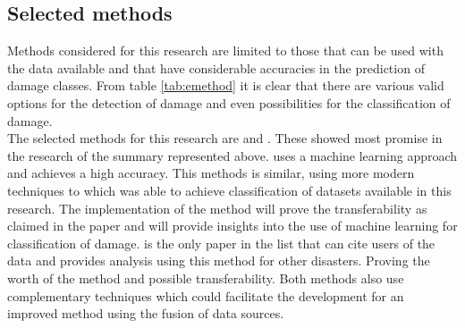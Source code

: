 \subsection{Selected methods} \label{sec:smethod}
Methods considered for this research are limited to those that can be used with the data available and that have considerable accuracies in the prediction of damage classes. From table \ref{tab:emethod} it is clear that there are various valid options for the detection of damage and even possibilities for the classification of damage. \\

The selected methods for this research are \citet{Vetrivel2016b} and \citet{Yun2015}. These showed most promise in the research of the summary represented above. \citet{Vetrivel2016b} uses a machine learning approach and achieves a high accuracy. This methods is similar, using more modern techniques to \cite{Samadzadegan2005} which was able to achieve classification of datasets available in this research. The implementation of the method will prove the transferability as claimed in the paper and will provide insights into the use of machine learning for classification of damage. \citet{Yun2015} is the only paper in the list that can cite users of the data and provides analysis using this method for other disasters. Proving the worth of the method and possible transferability. Both methods also use complementary techniques which could facilitate the development for an improved method using the fusion of data sources.